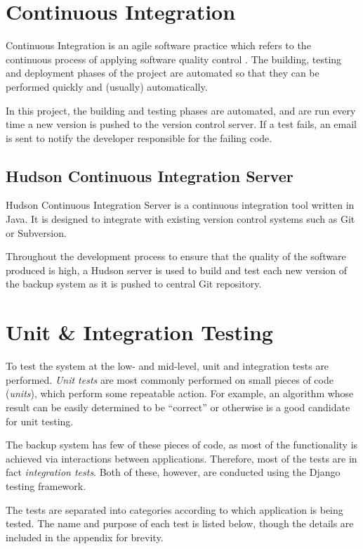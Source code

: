\section{Continuous Integration}
\label{sec:testing-ci}

Continuous Integration is an agile software practice which refers to the
continuous process of applying software quality control \cite{duvall2007}. The
building, testing and deployment phases of the project are automated so that
they can be performed quickly and (usually) automatically.

In this project, the building and testing phases are automated, and are run
every time a new version is pushed to the version control server. If a test
fails, an email is sent to notify the developer responsible for the failing
code.

\subsection{Hudson Continuous Integration Server}
\label{sec:testing-ci-hudson}

Hudson Continuous Integration Server is a continuous integration tool written
in Java. It is designed to integrate with existing version control systems such
as Git or Subversion.

Throughout the development process to ensure that the quality of the software
produced is high, a Hudson server is used to build and test each new version
of the backup system as it is pushed to central Git repository.

\section{Unit \& Integration Testing}

To test the system at the low- and mid-level, unit and integration tests are
performed. \emph{Unit tests} are most commonly performed on small pieces of
code (\emph{units}), which perform some repeatable action. For example, an
algorithm whose result can be easily determined to be ``correct'' or otherwise
is a good candidate for unit testing.

The backup system has few of these pieces of code, as most of the functionality
is achieved via interactions between applications. Therefore, most of the tests
are in fact \emph{integration tests}. Both of these, however, are conducted
using the Django testing framework.

The tests are separated into categories according to which application is being
tested. The name and purpose of each test is listed below, though the details
are included in the appendix for brevity.


